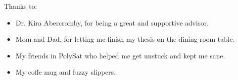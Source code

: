 \noindent
Thanks to:
\begin{itemize}
    \item Dr. Kira Abercromby, for being a great and supportive advisor.
    \item Mom and Dad, for letting me finish my thesis on the dining room table.
    \item My friends in PolySat who helped me get unstuck and kept me sane.
    \item My coffe mug and fuzzy slippers.
\end{itemize}
